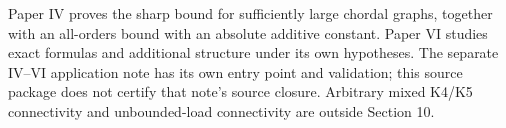 \documentclass[english,11pt,a4paper]{article}
\begin{document}
Paper IV proves the sharp bound for sufficiently large chordal graphs,
together with an all-orders bound with an absolute additive constant.
Paper VI studies exact formulas and additional structure under its own
hypotheses. The separate IV--VI application note has its own entry point
and validation; this source package does not certify that note's source
closure. Arbitrary mixed K4/K5 connectivity and unbounded-load
connectivity are outside Section 10.
\end{document}
